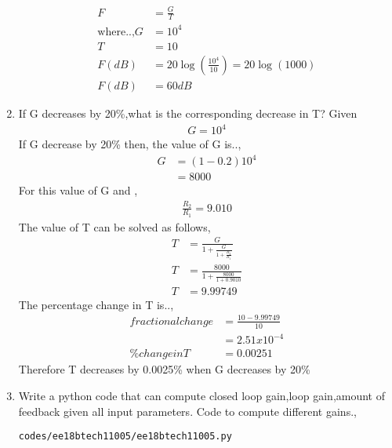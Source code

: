 \begin{enumerate}[label=\thesubsection.\arabic*.,ref=\thesubsection.\theenumi]
\begin{align}
F &= \frac{G}{T}\\
\text{where..,} G&=10^4 \\ T &= 10\\
F(dB) &= 20\log(\frac{10^4}{10})=20\log(1000)\\
F(dB) &= 60 dB
\end{align}
\item If G decreases by 20\%,what is the corresponding decrease in T?
\solution Given
\begin{align}
G = 10^4
\end{align}
If G decrease by 20\% then,
the value of G is..,
\begin{align}
    G &= (1-0.2)10^4 \\
      &= 8000
\end{align}
For this value of G and ,
\begin{align}
    \frac{R_2}{R_1} = 9.010
\end{align}
The value of T can be solved as follows,
\begin{align}
 T &= \frac{G}{1+\frac{G}{1+\frac{R_2}{R_1}}}\\
 T &= \frac{8000}{1+\frac{8000}{1+0.9010}}\\
 T &= 9.99749
\end{align}
The percentage change in T is..,
\begin{align}
    fractionalchange &= \frac{10-9.99749}{10}\\
      &= 2.51x10^{-4}\\
     \% change in T &= 0.00251
\end{align}
Therefore T decreases by 0.0025\% when G decreases by 20\%
\item Write a python code that can compute closed loop gain,loop gain,amount of feedback given all input parameters.
\solution
Code to compute different gains.,
\begin{lstlisting}
codes/ee18btech11005/ee18btech11005.py
\end{lstlisting}
\end{enumerate}
